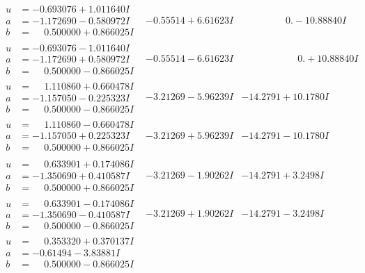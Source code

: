 \documentclass[1p]{elsarticle_modified}
\theoremstyle{definition}
\begin{document}
$$\begin{array}{c|c|c}
\begin{aligned}
u &= -0.693076 + 1.011640 I \\
a &= -1.172690 - 0.580972 I \\
b &= \phantom{-}0.500000 + 0.866025 I\end{aligned}
 & -0.55514 + 6.61623 I & \phantom{-0.000000 } 0. - 10.88840 I \\ \hline\begin{aligned}
u &= -0.693076 - 1.011640 I \\
a &= -1.172690 + 0.580972 I \\
b &= \phantom{-}0.500000 - 0.866025 I\end{aligned}
 & -0.55514 - 6.61623 I & \phantom{-0.000000 -}0. + 10.88840 I \\ \hline\begin{aligned}
u &= \phantom{-}1.110860 + 0.660478 I \\
a &= -1.157050 - 0.225323 I \\
b &= \phantom{-}0.500000 - 0.866025 I\end{aligned}
 & -3.21269 - 5.96239 I & -14.2791 + 10.1780 I \\ \hline\begin{aligned}
u &= \phantom{-}1.110860 - 0.660478 I \\
a &= -1.157050 + 0.225323 I \\
b &= \phantom{-}0.500000 + 0.866025 I\end{aligned}
 & -3.21269 + 5.96239 I & -14.2791 - 10.1780 I \\ \hline\begin{aligned}
u &= \phantom{-}0.633901 + 0.174086 I \\
a &= -1.350690 + 0.410587 I \\
b &= \phantom{-}0.500000 + 0.866025 I\end{aligned}
 & -3.21269 - 1.90262 I & -14.2791 + 3.2498 I \\ \hline\begin{aligned}
u &= \phantom{-}0.633901 - 0.174086 I \\
a &= -1.350690 - 0.410587 I \\
b &= \phantom{-}0.500000 - 0.866025 I\end{aligned}
 & -3.21269 + 1.90262 I & -14.2791 - 3.2498 I \\ \hline\begin{aligned}
u &= \phantom{-}0.353320 + 0.370137 I \\
a &= -0.61494 - 3.83881 I \\
b &= \phantom{-}0.500000 - 0.866025 I\end{aligned}

\end{array}$$
\end{document}

